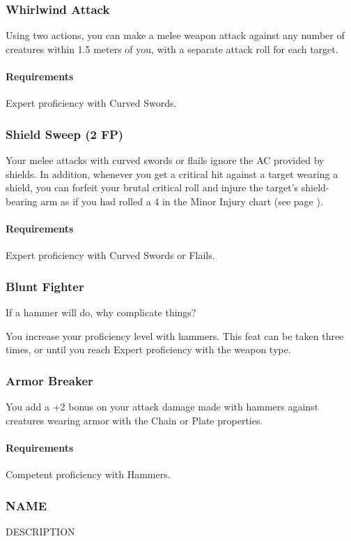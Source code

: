 \subsubsection{Whirlwind Attack} \label{feat::whirlwindattack}
    Using two actions, you can make a melee weapon attack against any number of creatures within 1.5 meters of you, with a separate attack roll for each target.
    \paragraph{Requirements} Expert proficiency with Curved Swords.
\subsubsection{Shield Sweep (2 FP)} \label{feat::shieldsweep}
    Your melee attacks with curved swords or flails ignore the AC provided by shields.
    In addition, whenever you get a critical hit against a target wearing a shield, you can forfeit your brutal critical roll and injure the target's shield-bearing arm as if you had rolled a 4 in the Minor Injury chart (see page \pageref{ssec::injuriesandinsanity}).
    \paragraph{Requirements} Expert proficiency with Curved Swords or Flails.
\subsubsection{Blunt Fighter} \label{feat::bluntfighter}
    If a hammer will do, why complicate things?

    You increase your proficiency level with hammers.
    This feat can be taken three times, or until you reach Expert proficiency with the weapon type.
\subsubsection{Armor Breaker} \label{feat::armorbreaker}
    You add a +2 bonus on your attack damage made with hammers against creatures wearing armor with the Chain or Plate properties.
    \paragraph{Requirements} Competent proficiency with Hammers.
\subsubsection{NAME} \label{feat::name}
    DESCRIPTION
